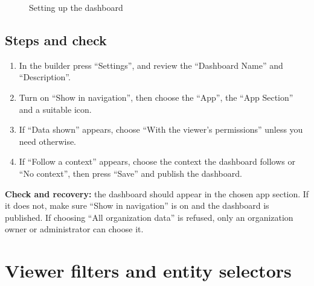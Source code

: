 \begin{figure}[H]
\centering
{}
\rclegend
\caption{Setting up the dashboard}
\label{fig:builder-dashboards-settings-flow}
\end{figure}

\subsection{Steps and check}
\begin{enumerate}
\item In the builder press “Settings”, and review the “Dashboard Name” and “Description”.
\item Turn on “Show in navigation”, then choose the “App”, the “App Section” and a suitable icon.
\item If “Data shown” appears, choose “With the viewer’s permissions” unless you need otherwise.
\item If “Follow a context” appears, choose the context the dashboard follows or “No context”, then press “Save” and publish the dashboard.
\end{enumerate}

\textbf{Check and recovery:} the dashboard should appear in the chosen app section. If it does not, make sure “Show in navigation” is on and the dashboard is published. If choosing “All organization data” is refused, only an organization owner or administrator can choose it.

\clearpage
\section{Viewer filters and entity selectors}
\label{sec:builder-feature-dashboards-filters}

